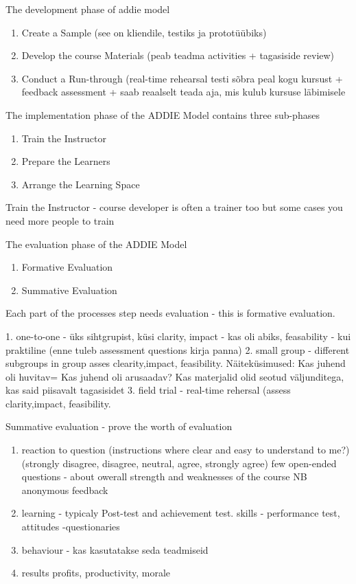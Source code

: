 The development phase of addie model

\begin{enumerate}
\item Create a Sample (see on kliendile, testiks ja prototüübiks)
\item Develop the course Materials (peab teadma activities + tagasiside review)
\item Conduct a Run-through (real-time rehearsal testi sõbra peal kogu kursust +  feedback assessment + saab reaalselt teada aja, mis kulub kursuse läbimisele
\end{enumerate}


The implementation phase of the ADDIE Model contains three sub-phases

\begin{enumerate}
\item Train the Instructor
\item Prepare the Learners
\item Arrange the Learning Space
\end{enumerate}

Train the Instructor - course developer is often a trainer too but some cases you need more people to train



The evaluation phase of the ADDIE Model
\begin{enumerate}
\item Formative Evaluation
\item Summative Evaluation
\end{enumerate}

Each part of the processes step needs evaluation - this is formative evaluation.

1. one-to-one - üks sihtgrupist, küsi clarity, impact - kas oli abiks, feasability - kui praktiline (enne tuleb assessment questions kirja panna)
2. small group  - different subgroups in group asses clearity,impact, feasibility. Näiteküsimused: Kas juhend oli huvitav= Kas juhend oli arusaadav? Kas materjalid olid seotud väljunditega, kas said piisavalt tagasisidet
3. field trial -  real-time rehersal (assess clarity,impact, feasibility.

Summative evaluation - prove the worth of evaluation
\begin{enumerate}
\item reaction to question (instructions where clear and easy to understand to me?) (strongly disagree, disagree, neutral, agree, strongly agree) few open-ended questions - about owerall strength and weaknesses of the course NB anonymous feedback
\item learning - typicaly Post-test and achievement test. skills - performance test, attitudes -questionaries
\item behaviour - kas kasutatakse seda teadmiseid
\item results profits, productivity, morale
\end{enumerate}


